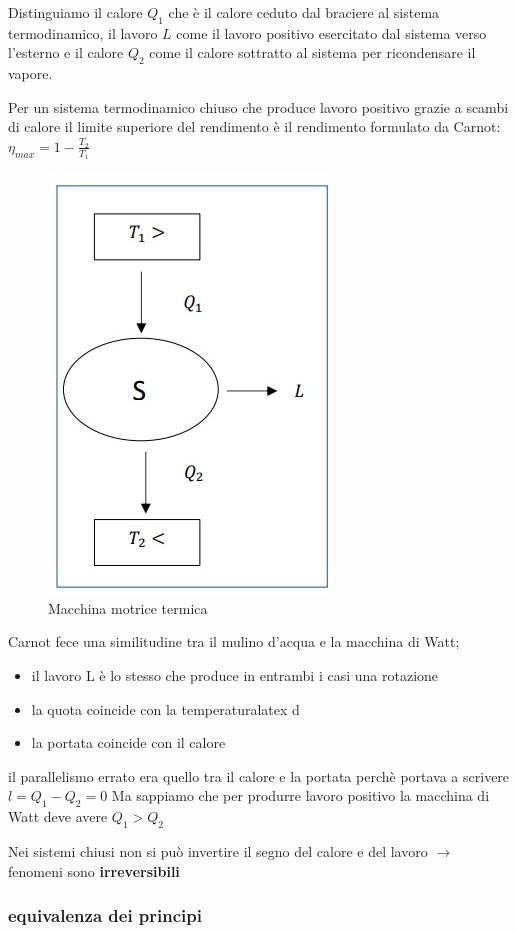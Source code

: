 \documentclass[a4paper]{article}
\numberwithin{equation}{section}%
\begin{document}
Distinguiamo il calore $Q_1$ che è il calore ceduto dal braciere al sistema termodinamico, il lavoro $L$ come il lavoro positivo esercitato dal sistema verso l'esterno e il calore $Q_2$ come il calore sottratto al sistema per ricondensare il vapore.

Per un sistema termodinamico chiuso che produce lavoro positivo grazie a scambi di calore il limite superiore del rendimento è il rendimento formulato da Carnot: $\eta_{max}=1-\frac{T_2}{T_1}$

\begin{figure}[H]
	\begin{center}
		\caption{Macchina motrice termica}
		\includegraphics[width=0.2\columnwidth]{sistema.jpg}
	\end{center}
\end{figure}

Carnot fece una similitudine tra il mulino d'acqua e la macchina di Watt;
\begin{itemize}
	\item il lavoro L è lo stesso che produce in entrambi i casi una rotazione
	\item la quota coincide con la temperaturalatex d
	\item la portata coincide con il calore
\end{itemize}

il parallelismo errato era quello tra il calore e la portata perchè portava a scrivere $l=Q_1-Q_2=0$
Ma sappiamo che per produrre lavoro positivo la macchina di Watt deve avere $Q_1>Q_2$

Nei sistemi chiusi non si può invertire il segno del calore e del lavoro $\longrightarrow $ fenomeni sono \textbf{irreversibili}

\subsubsection{equivalenza dei principi}
\end{document}
